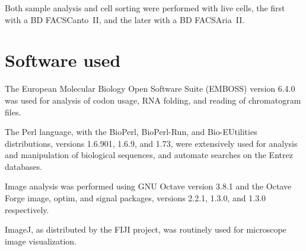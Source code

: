     Both sample analysis and cell sorting were performed with live cells, the
    first with a BD FACSCanto~II, and the later with a BD FACSAria~II.

\section{Software used}
  \label{sec:methods:software}

  The European Molecular Biology Open Software Suite (EMBOSS) version 6.4.0
  was used for analysis of codon usage, RNA folding, and reading of
  chromatogram files.

  The Perl language, with the BioPerl, BioPerl-Run, and Bio-EUtilities
  distributions, versions 1.6.901, 1.6.9, and 1.73, were extensively used
  for analysis and manipulation of biological sequences, and automate searches
  on the Entrez databases.

  Image analysis was performed using GNU Octave version 3.8.1 and the Octave
  Forge image, optim, and signal packages, versions 2.2.1, 1.3.0, and 1.3.0
  respectively.

  ImageJ, as distributed by the FIJI project, was routinely used for microscope
  image visualization.

